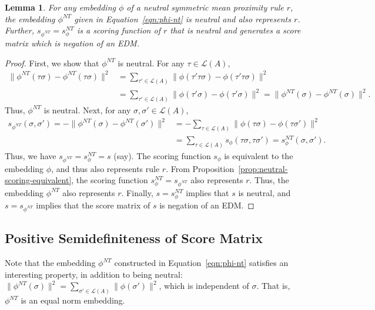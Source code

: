 \documentclass[10pt,letterpaper]{article}
\newcommand{\calL}{{\mathcal{L}}}
\newcommand{\rank}{{\calL(A)}}
\newtheorem{lemma}{Lemma}
\newcommand{\nt}{NT}
\begin{document}
\begin{lemma}
For any embedding $\phi$ of a neutral symmetric mean proximity rule $r$, the embedding $\phi^{\nt}$ given in Equation~\eqref{eqn:phi-nt} is neutral and also represents $r$. Further, $s_{\phi^{\nt}} = s_{\phi}^{\nt}$ is a scoring function of $r$ that is neutral and generates a score matrix which is negation of an EDM.
\label{lem:neutral-connection}
\end{lemma}
\begin{proof}
First, we show that $\phi^{\nt}$ is neutral. For any $\tau \in \rank$, 
\begin{align*}
\|\phi^{\nt}(\tau \sigma)-\phi^{\nt}(\tau \sigma)\|^2 &= \sum_{\tau' \in \rank} \|\phi(\tau' \tau \sigma)-\phi(\tau' \tau \sigma)\|^2 \\
&= \sum_{\tau' \in \rank} \|\phi(\tau' \sigma)-\phi(\tau' \sigma)\|^2 = \|\phi^{\nt}(\sigma)-\phi^{\nt}(\sigma)\|^2.
\end{align*}
Thus, $\phi^{\nt}$ is neutral. Next, for any $\sigma,\sigma' \in \rank$, 
\begin{align*}
s_{\phi^{\nt}}(\sigma,\sigma') = -\|\phi^{\nt}(\sigma)-\phi^{\nt}(\sigma')\|^2 &= - \sum_{\tau \in \rank} \|\phi(\tau \sigma)-\phi(\tau \sigma')\|^2  \\
&= \sum_{\tau \in \rank} s_{\phi}(\tau \sigma,\tau \sigma') = s_{\phi}^{\nt}(\sigma,\sigma').
\end{align*}
Thus, we have $s_{\phi^{\nt}} = s_{\phi}^{\nt} = s$ (say). The scoring function $s_{\phi}$ is equivalent to the embedding $\phi$, and thus also represents rule $r$. From Proposition~\ref{prop:neutral-scoring-equivalent}, the scoring function $s_{\phi}^{\nt} = s_{\phi^{\nt}}$ also represents $r$. Thus, the embedding $\phi^{\nt}$ also represents $r$. Finally, $s = s_{\phi}^{\nt}$ implies that $s$ is neutral, and $s = s_{\phi^{\nt}}$ implies that the score matrix of $s$ is negation of an EDM.
\end{proof}


\subsection{Positive Semidefiniteness of Score Matrix}
Note that the embedding $\phi^{\nt}$ constructed in Equation~\eqref{eqn:phi-nt} satisfies an interesting property, in addition to being neutral: $\|\phi^{\nt}(\sigma)\|^2 = \sum_{\sigma' \in \rank} \|\phi(\sigma')\|^2$, which is independent of $\sigma$. That is, $\phi^{\nt}$ is an equal norm embedding.
\end{document}
